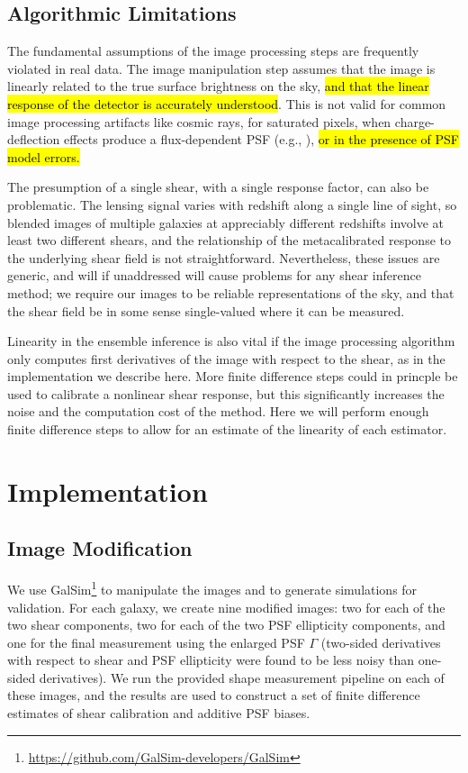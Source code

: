 \documentclass[iop]{emulateapj}
\begin{document}
\subsection{Algorithmic Limitations}
The fundamental assumptions of the image processing steps are
frequently violated in real data. The image manipulation step assumes
that the image is linearly related to the true surface brightness on
the sky, \hl{and that the linear response of the detector is accurately
understood}. This is not valid for common image processing artifacts
like cosmic rays, for saturated pixels, when charge-deflection
effects produce a flux-dependent PSF (e.g.,
\citealt{2015JInst..10C5032G, 2017JInst..12C3091L}), \hl{or in the
presence of PSF model errors.}

The presumption of a single shear, with a single response factor, can
also be problematic. The lensing signal varies with redshift along a
single line of sight, so blended images of multiple galaxies at
appreciably different redshifts involve at least two different shears,
and the relationship of the metacalibrated response to the underlying
shear field is not straightforward. Nevertheless, these issues are
generic, and will if unaddressed will cause problems for any shear
inference method; we require our images to be reliable representations
of the sky, and that the shear field be in some sense single-valued
where it can be measured.

Linearity in the ensemble inference is also vital if the image
processing algorithm only computes first derivatives of the image with
respect to the shear, as in the implementation we describe here. More
finite difference steps could in princple be used to calibrate a
nonlinear shear response, but this significantly increases the noise
and the computation cost of the method. Here we will perform enough
finite difference steps to allow for an estimate of the linearity of
each estimator.


\section{Implementation}
\subsection{Image Modification}\label{subsec:imagemod}
We use
GalSim\footnote{\url{https://github.com/GalSim-developers/GalSim}} to
manipulate the images and to generate simulations for validation. For
each galaxy, we create nine modified images: two for each of the two
shear components, two for each of the two PSF ellipticity components,
and one for the final measurement using the enlarged PSF $\Gamma$
(two-sided derivatives with respect to shear and PSF ellipticity were
found to be less noisy than one-sided derivatives).  We run the
provided shape measurement pipeline on each of these images, and the
results are used to construct a set of finite difference estimates of
shear calibration and additive PSF biases.
\end{document}
